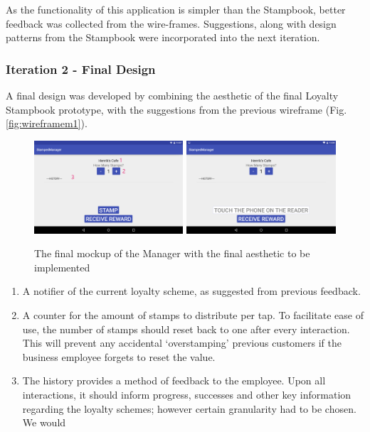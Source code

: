 As the functionality of this application is simpler than the Stampbook, better feedback was collected from the wire-frames. Suggestions, along with design patterns from the Stampbook were incorporated into the next iteration.

\subsubsection{Iteration 2 - Final Design}
A final design was developed by combining the aesthetic of the final Loyalty Stampbook prototype, with the suggestions from the previous wireframe  (Fig. \ref{fig:wireframem1}).
\begin{figure}[H]
 \centering
  \includegraphics[width=0.494\textwidth]{img/readerfinalmock2.png}
   \includegraphics[width=0.494\textwidth]{img/readerfinalmock1.png}
     \caption{The final mockup of the Manager with the final aesthetic to be implemented}
     \label{fig:wireframem2}
\end{figure}

\begin{enumerate}
  \item A notifier of the current loyalty scheme, as suggested from previous feedback.
  \item A counter for the amount of stamps to distribute per tap. To facilitate ease of use, the number of stamps should reset back to one after every interaction. This will prevent any accidental `overstamping' previous customers if the business employee forgets to reset the value.
  \item The history provides a method of feedback to the employee. Upon all interactions, it should inform progress, successes and other key information regarding the loyalty schemes; however certain granularity had to be chosen. We would 
\end{enumerate}

